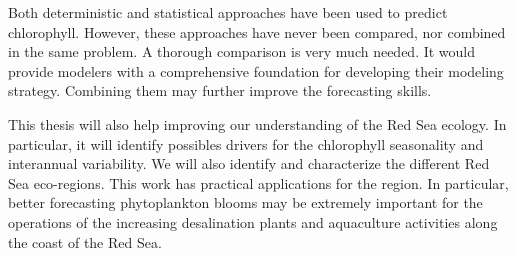 Both deterministic and statistical approaches have been used to
predict chlorophyll. However, these approaches have never been compared, nor
combined in the same problem. A thorough comparison is very much needed. It
would provide modelers with a comprehensive foundation for developing their
modeling strategy. Combining them may further improve the forecasting skills.

This thesis will also help improving our understanding of the Red Sea ecology.
In particular, it will identify possibles drivers for the chlorophyll
seasonality and interannual variability. We will also identify and characterize
the different Red Sea eco-regions. This work has practical applications for the
region. In particular, better forecasting phytoplankton blooms may be extremely
important for the operations of the increasing desalination plants and
aquaculture activities along the coast of the Red Sea.
